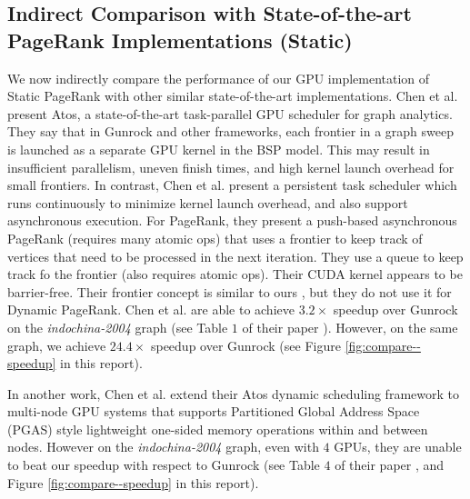 \subsection{Indirect Comparison with State-of-the-art PageRank Implementations (Static)}
\label{sec:static-comparison-indirect}

We now indirectly compare the performance of our GPU implementation of Static PageRank with other similar state-of-the-art implementations. Chen et al. \cite{chen2022atos} present Atos, a state-of-the-art task-parallel GPU scheduler for graph analytics. They say that in Gunrock and other frameworks, each frontier in a graph sweep is launched as a separate GPU kernel in the BSP model. This may result in insufficient parallelism, uneven finish times, and high kernel launch overhead for small frontiers. In contrast, Chen et al. present a persistent task scheduler which runs continuously to minimize kernel launch overhead, and also support asynchronous execution. For PageRank, they present a push-based asynchronous PageRank (requires many atomic ops) that uses a frontier to keep track of vertices that need to be processed in the next iteration. They use a queue to keep track fo the frontier (also requires atomic ops). Their CUDA kernel appears to be barrier-free. Their frontier concept is similar to ours \cite{sahu2024df}, but they do not use it for Dynamic PageRank. Chen et al. are able to achieve $3.2\times$ speedup over Gunrock on the \textit{indochina-2004} graph (see Table $1$ of their paper \cite{chen2022atos}). However, on the same graph, we achieve $24.4\times$ speedup over Gunrock (see Figure \ref{fig:compare--speedup} in this report).

In another work, Chen et al. \cite{chen2022scalable} extend their Atos dynamic scheduling framework to multi-node GPU systems that supports Partitioned Global Address Space (PGAS) style lightweight one-sided memory operations within and between nodes. However on the \textit{indochina-2004} graph, even with $4$ GPUs, they are unable to beat our speedup with respect to Gunrock (see Table $4$ of their paper \cite{chen2022scalable}, and Figure \ref{fig:compare--speedup} in this report).

